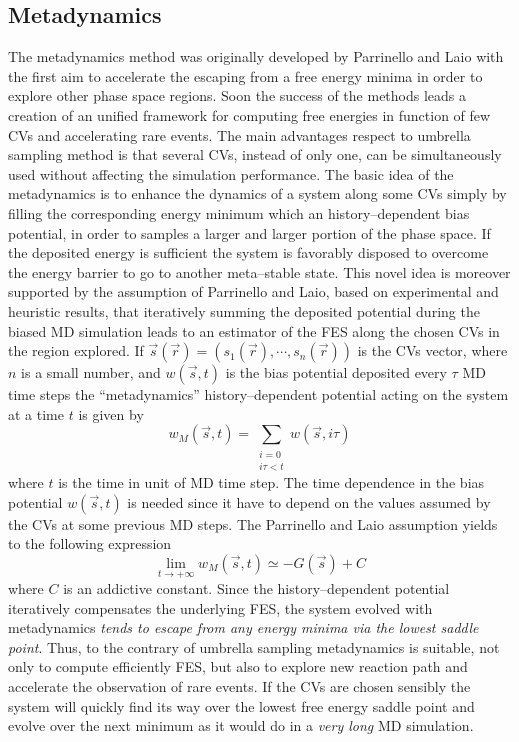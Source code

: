 \subsection{Metadynamics}
The metadynamics method was originally developed by Parrinello and Laio \cite{MetadParrinello} with the first aim to accelerate the escaping from a free energy minima in order to explore other phase space regions. Soon the success of the methods leads a creation of an unified framework for computing free energies in function of few \acp{CV} and accelerating rare events. The main advantages respect to umbrella sampling method is that several \acp{CV}, instead of only one, can be simultaneously used without affecting the simulation performance. The basic idea of the metadynamics is to enhance the dynamics of a system along some \acp{CV} simply by filling the corresponding energy minimum which an history--dependent bias potential, in order to samples a larger and larger portion of the phase space. If the deposited energy is sufficient the system is favorably disposed to overcome the energy barrier to go to another meta--stable state. This novel idea is moreover supported by the assumption of Parrinello and Laio, based on experimental and heuristic results, that iteratively summing the deposited potential during the biased \ac{MD} simulation leads to an estimator of the \ac{FES} along the chosen \acp{CV} in the region explored. If $\vec s(\vec r) = (s_1(\vec r), \cdots, s_n(\vec r))$ is the \acp{CV} vector, where $n$ is a small number, and $w(\vec s, t)$ is the bias potential deposited every $\tau$ \ac{MD} time steps the ``metadynamics'' history--dependent potential acting on the system at a time $t$ is given by
\begin{equation*}
	w_M(\vec s, t) = \sum_{\substack{i=0 \\ i\tau < t}} w(\vec s, i\tau)
\end{equation*}
where $t$ is the time in unit of \ac{MD} time step. The time dependence in the bias potential $w(\vec s, t)$ is needed since it have to depend on the values assumed by the \acp{CV} at some previous \ac{MD} steps. The Parrinello and Laio assumption yields to the following expression
\begin{equation}
	\lim_{t\to + \infty} w_M(\vec s, t)  \simeq -G(\vec s) + C
	\label{eq:metadfes}
\end{equation} 
where $C$ is an addictive constant. Since the history--dependent potential iteratively compensates the underlying \ac{FES}, the system evolved with metadynamics \textit{tends to escape from any energy minima via the lowest saddle point}. Thus, to the contrary of umbrella sampling metadynamics is suitable, not only to compute efficiently \ac{FES}, but also to explore new reaction path and accelerate the observation of rare events. If the \acp{CV} are chosen sensibly the system will quickly find its way over the lowest free energy saddle point and evolve over the next minimum as it would do in a \textit{very long} \ac{MD} simulation.

